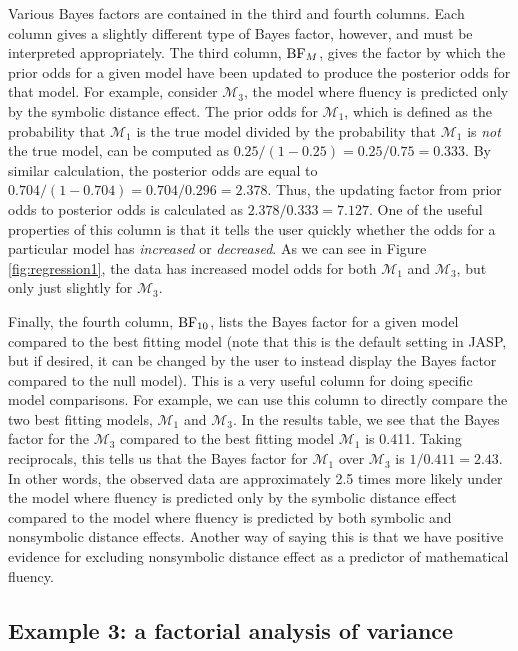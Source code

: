 \documentclass[english,,doc,floatsintext]{apa6}
\begin{document}
Various Bayes factors are contained in the third and fourth columns. Each column gives a slightly different type of Bayes factor, however, and must be interpreted appropriately. The third column, \(\textnormal{BF}_{M}\), gives the factor by which the prior odds for a given model have been updated to produce the posterior odds for that model. For example, consider \(\mathcal{M}_3\), the model where fluency is predicted only by the symbolic distance effect. The prior odds for \(\mathcal{M}_1\), which is defined as the probability that \(\mathcal{M}_1\) is the true model divided by the probability that \(\mathcal{M}_1\) is \emph{not} the true model, can be computed as \(0.25/(1-0.25) = 0.25/0.75 = 0.333\). By similar calculation, the posterior odds are equal to \(0.704/(1-0.704) = 0.704/0.296 = 2.378\). Thus, the updating factor from prior odds to posterior odds is calculated as \(2.378/0.333 = 7.127\). One of the useful properties of this column is that it tells the user quickly whether the odds for a particular model has \emph{increased} or \emph{decreased}. As we can see in Figure \ref{fig:regression1}, the data has increased model odds for both \(\mathcal{M}_1\) and \(\mathcal{M}_3\), but only just slightly for \(\mathcal{M}_3\).

Finally, the fourth column, \(\textnormal{BF}_{10}\), lists the Bayes factor for a given model compared to the best fitting model (note that this is the default setting in JASP, but if desired, it can be changed by the user to instead display the Bayes factor compared to the null model). This is a very useful column for doing specific model comparisons. For example, we can use this column to directly compare the two best fitting models, \(\mathcal{M}_1\) and \(\mathcal{M}_3\). In the results table, we see that the Bayes factor for the \(\mathcal{M}_3\) compared to the best fitting model \(\mathcal{M}_1\) is 0.411. Taking reciprocals, this tells us that the Bayes factor for \(\mathcal{M}_1\) over \(\mathcal{M}_3\) is \(1/0.411 = 2.43\). In other words, the observed data are approximately 2.5 times more likely under the model where fluency is predicted only by the symbolic distance effect compared to the model where fluency is predicted by both symbolic and nonsymbolic distance effects. Another way of saying this is that we have positive evidence for excluding nonsymbolic distance effect as a predictor of mathematical fluency.

\hypertarget{example-3-a-factorial-analysis-of-variance}{%
\subsection{Example 3: a factorial analysis of variance}\label{example-3-a-factorial-analysis-of-variance}}
\end{document}
